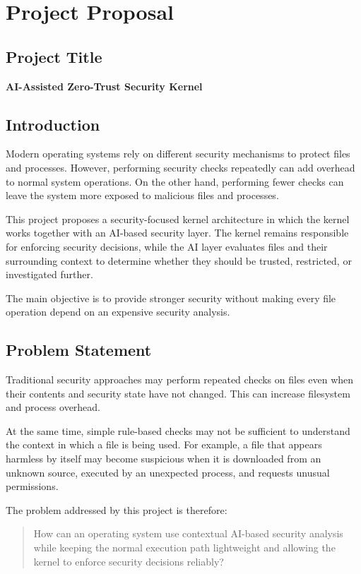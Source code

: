\section{Project Proposal}

\subsection{Project Title}

\textbf{AI-Assisted Zero-Trust Security Kernel}

\subsection{Introduction}

Modern operating systems rely on different security mechanisms to protect files and processes. However, performing security checks repeatedly can add overhead to normal system operations. On the other hand, performing fewer checks can leave the system more exposed to malicious files and processes.

This project proposes a security-focused kernel architecture in which the kernel works together with an AI-based security layer. The kernel remains responsible for enforcing security decisions, while the AI layer evaluates files and their surrounding context to determine whether they should be trusted, restricted, or investigated further.

The main objective is to provide stronger security without making every file operation depend on an expensive security analysis.

\subsection{Problem Statement}

Traditional security approaches may perform repeated checks on files even when their contents and security state have not changed. This can increase filesystem and process overhead.

At the same time, simple rule-based checks may not be sufficient to understand the context in which a file is being used. For example, a file that appears harmless by itself may become suspicious when it is downloaded from an unknown source, executed by an unexpected process, and requests unusual permissions.

The problem addressed by this project is therefore:

\begin{quote}
How can an operating system use contextual AI-based security analysis while keeping the normal execution path lightweight and allowing the kernel to enforce security decisions reliably?
\end{quote}

